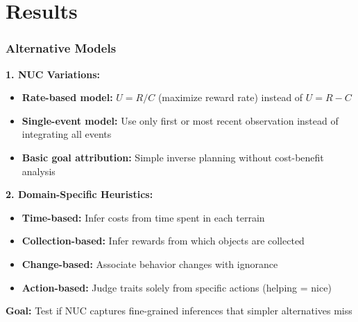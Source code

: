 \documentclass{beamer}
\begin{document}
\section{Results}

\begin{frame}
\frametitle{Alternative Models}
\textbf{1. NUC Variations:}
\begin{itemize}
    \item \textbf{Rate-based model:} $U = R/C$ (maximize reward rate) instead of $U = R - C$
    \item \textbf{Single-event model:} Use only first or most recent observation instead of integrating all events
    \item \textbf{Basic goal attribution:} Simple inverse planning without cost-benefit analysis
\end{itemize}

\vspace{0.15cm}
\textbf{2. Domain-Specific Heuristics:}
\begin{itemize}
    \item \textbf{Time-based:} Infer costs from time spent in each terrain
    \item \textbf{Collection-based:} Infer rewards from which objects are collected
    \item \textbf{Change-based:} Associate behavior changes with ignorance
    \item \textbf{Action-based:} Judge traits solely from specific actions (helping = nice)
\end{itemize}

\vspace{0.15cm}
\textbf{Goal:} Test if NUC captures fine-grained inferences that simpler alternatives miss
\end{frame}
\end{document}
